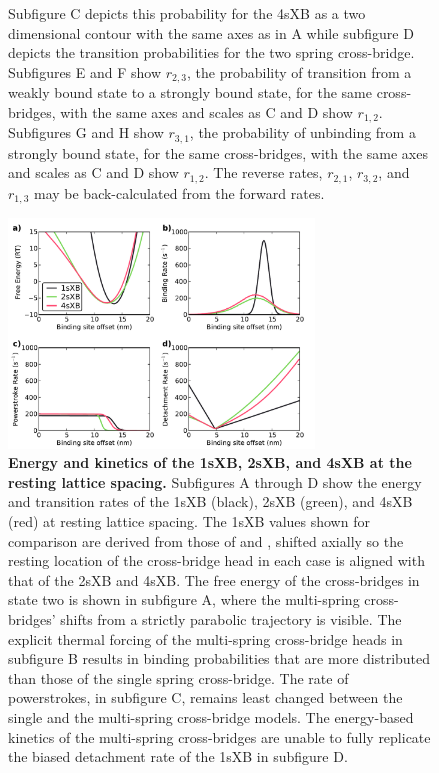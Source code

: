 \documentclass[]{article}
\begin{document}
\begin{figure}[ht]
\begin{center}
{        Subfigure C depicts this probability for the 4sXB as a two dimensional contour with the same axes as in A while subfigure D depicts the transition probabilities for the two spring cross-bridge.
        Subfigures E and F show $r_{2,3}$, the probability of transition from a weakly bound state to a strongly bound state, for the same cross-bridges, with the same axes and scales as C and D show $r_{1,2}$.
        Subfigures G and H show $r_{3,1}$, the probability of unbinding from a strongly bound state, for the same cross-bridges, with the same axes and scales as C and D show $r_{1,2}$.
        The reverse rates, $r_{2,1}$, $r_{3,2}$, and $r_{1,3}$ may be back-calculated from the forward rates.
    }
    \end{center}
\end{figure}

\begin{figure}[ht]
    \begin{center}
    \includegraphics[width=3.2in]{../imgs/Figure3.pdf}
    \caption{
        \label{fig_kinetics_cuts}
        \textbf{Energy and kinetics of the 1sXB, 2sXB, and 4sXB at the resting lattice spacing.}
        Subfigures A through D show the energy and transition rates of the 1sXB (black), 2sXB (green), and 4sXB (red) at resting lattice spacing.
        The 1sXB values shown for comparison are derived from those of \citet{Daniel1998} and \citet{Tanner2007}, shifted axially so the resting location of the cross-bridge head in each case is aligned with that of the 2sXB and 4sXB\@. 
        The free energy of the cross-bridges in state two is shown in subfigure A, where the multi-spring cross-bridges' shifts from a strictly parabolic trajectory is visible.
        The explicit thermal forcing of the multi-spring cross-bridge heads in subfigure B results in binding probabilities that are more distributed than those of the single spring cross-bridge.
        The rate of powerstrokes, in subfigure C, remains least changed between the single and the multi-spring cross-bridge models.
        The energy-based kinetics of the multi-spring cross-bridges are unable to fully replicate the biased detachment rate of the 1sXB in subfigure D. 
    }
    \end{center}
\end{figure}
\end{document}

